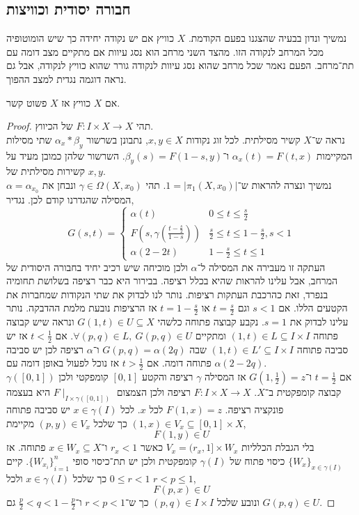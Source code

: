 \subsection{חבורה יסודית וכוויצות}
נמשיך ונדון בבעיה שהצגנו בפעם הקודמת.
$X$ כוויץ אם יש נקודה יחידה כך שיש הומוטופיה מכל המרחב לנקודה הזו.
מהצד השני מרחב הוא נסג עיוות אם מתקיים מצב דומה עם תת־מרחב.
הפעם נאמר שכל מרחב שהוא נסג עיוות לנקודה גורר שהוא כוויץ לנקודה, אבל גם נראה דוגמה נגדית למצב ההפוך.
\begin{theorem}
	אם $X$ כוויץ אז $X$ פשוט קשר.
\end{theorem}
\begin{proof}
	תהי $F : I \times X \to X$ של הכיווץ. \\
	נראה ש־$X$ קשיר מסילתית.
	לכל זוג נקודות $x, y \in X$, נתבונן בשרשור $\alpha_x * \beta_y$ שתי מסילות המקיימות $\alpha_x(t) = F(t, x)$ ו־$\beta_y(s) = F(1 - s, y)$.
	השרשור שלהן כמובן מעיד על קשירות מסילתית של $x, y$. \\
	נמשיך ונצרה להראות ש־$1 = |\pi_1(X, x_0)|$.
	תהי $\gamma \in \Omega(X, x_0)$ ונבחן את $\alpha = \alpha_{x_0}$ המסילה שהגדרנו קודם לכן.
	נגדיר,
	\[
		G(s, t)
		= \begin{cases}
			\alpha(t) & 0 \le t \le \frac{s}{2} \\
			F(s, \gamma(\frac{t - \frac{s}{2}}{1 - s})) & \frac{s}{2} \le t \le 1 - \frac{s}{2}, s < 1 \\
			\alpha(2 - 2t) & 1 - \frac{s}{2} \le t \le 1
		\end{cases}
	\]
	העתקה זו מעבירה את המסילה ל־$\alpha$ ולכן מוכיחה שיש רכיב יחיד בחבורה היסודית של המרחב, אבל עלינו להראות שהיא בכלל רציפה.
	בבירור היא כבר רציפה בשלושת תחומיה בנפרד, זאת כהרכבת העתקות רציפות.
	נותר לנו לבדוק את שתי הנקודות שמחברות את הקטעים הללו.
	אם $s < 1$ וגם $t = \frac{s}{2}$ או $t = 1 - \frac{s}{2}$ אז הרציפות נובעת מלמת ההדבקה.
	נותר עלינו לבדוק את $s = 1$.
	נקבע קבוצה פתוחה כלשהי $G(1, t) \in U \subseteq X$ ונראה שיש קבוצה פתוחה $(1, t) \in L \subseteq I \times I$ ומתקיים $\forall (p, q) \in L,\ G(p, q) \in U$.
	אם $t < \frac{1}{2}$ אז יש סביבה פתוחה $(1, t) \in L' \subseteq I \times I$ שבה $G(p, q) = \alpha(2q)$ ו־$\alpha$ רציפה לכן יש סביבה פתוחה דומה.
	אם $t > \frac{1}{2}$ אז נוכל לפעול באופן דומה עם $\alpha(2 - 2q)$. \\
	אם $t = \frac{1}{2}$ ו־$G(1, \frac{1}{2}) = z$ אז המסילה $\gamma$ רציפה והקטע $[0, 1]$ קומפקטי ולכן $\gamma([0, 1])$ קבוצה קומפקטית ב־$X$.
	$F : I \times X \to X$ רציפה ולכן הצמצום $F \mid_{I \times \gamma([0, 1])}$ היא בעצמה פונקציה רציפה.
	$F(1, x) = z$ לכל $x$.
	לכל $x \in \gamma(I)$ יש סביבה פתוחה $(1, x) \in V_x \subseteq [0, 1] \times X$ כך שלכל $(p, y) \in V_x$ מקיימת,
	\[
		F(1, y) \in U
	\]
	בלי הגבלת הכלליות $V_x = (r_x, 1] \times W_x$ כאשר $r_x < 1$ ו־$x \in W_x \subseteq X$ פתוחה.
	אז ${\{ W_x \}}_{x \in \gamma(I)}$ כיסוי פתוח של $\gamma(I)$ קומפקטית ולכן יש תת־כיסוי סופי ${\{ W_{x_i} \}}_{i = 1}^n$.
	קיים $0 \le r < 1$ כך שלכל $x \in \gamma(I)$ ולכל $r < p \le 1$,
	\[
		F(p, x) \in U
	\]
	ונובע שלכל $(p, q) \in I \times I$ כך ש־$r < p < 1$ ו־$\frac{p}{2} < q < 1 - \frac{p}{2}$ גם $G(p, q) \in U$.
\end{proof}

